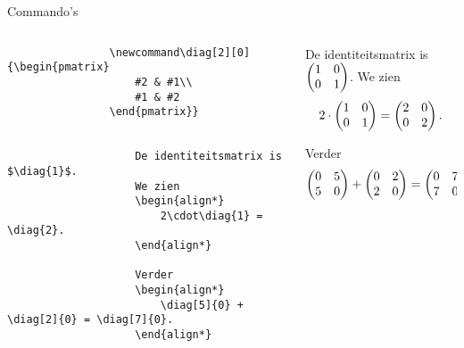 \begin{frame}[fragile]{Commando's}
    \begin{columns}
        \begin{column}{0.5\textwidth}
            \begin{verbatim}
                \newcommand\diag[2][0]{\begin{pmatrix}
                    #2 & #1\\
                    #1 & #2
                \end{pmatrix}}
        
                
                    De identiteitsmatrix is $\diag{1}$.
                    We zien
                    \begin{align*}
                        2\cdot\diag{1} = \diag{2}.
                    \end{align*}

                    Verder
                    \begin{align*}
                        \diag[5]{0} + \diag[2]{0} = \diag[7]{0}.
                    \end{align*}
                
            \end{verbatim}
        \end{column}
        \begin{column}{0.5\textwidth}
            \begin{demobox}\small\setlength\parskip{5pt}    
                De identiteitsmatrix is $\diag{1}$.
                We zien
                \begin{align*}
                    2\cdot\diag{1} = \diag{2}.
                \end{align*}

                Verder
                \begin{align*}
                    \diag[5]{0} + \diag[2]{0} = \diag[7]{0}.
                \end{align*}
            \end{demobox}
        \end{column}
    \end{columns}
\end{frame}

